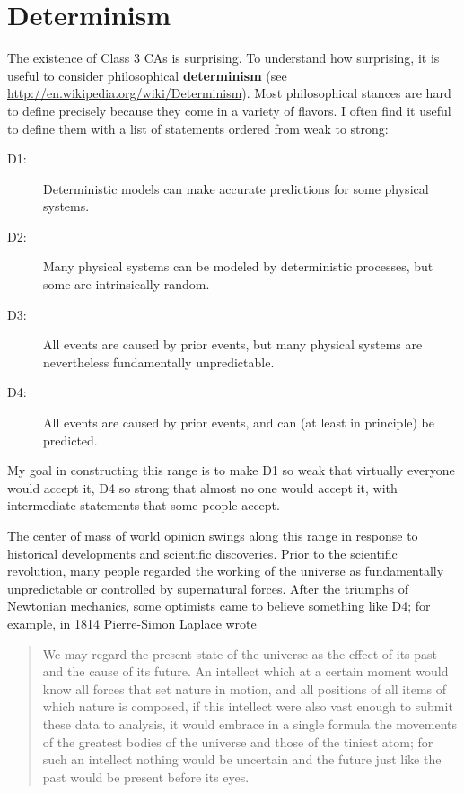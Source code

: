 \documentclass[10pt]{book}
\begin{document}
\section{Determinism}
\label{determinism}

The existence of Class 3 CAs is surprising.  To understand how
surprising, it is useful to consider philosophical
{\bf determinism} (see \url{http://en.wikipedia.org/wiki/Determinism}).
Most philosophical stances are hard to define precisely because
they come in a variety of flavors.  I often find it useful
to define them with a list of statements ordered from weak
to strong:

\begin{description}

\item[D1:] Deterministic models can make accurate predictions
for some physical systems.

\item[D2:] Many physical systems can be modeled by deterministic
processes, but some are intrinsically random.

\item[D3:] All events are caused by prior events, but many
physical systems are nevertheless fundamentally unpredictable.

\item[D4:] All events are caused by prior events, and can (at
least in principle) be predicted.

\end{description}

My goal in constructing this range is to make D1 so weak that
virtually everyone would accept it, D4 so strong that almost no one
would accept it, with intermediate statements that some people accept.

The center of mass of world opinion swings along this range in
response to historical developments and scientific discoveries.  Prior
to the scientific revolution, many people regarded the working of the
universe as fundamentally unpredictable or controlled by supernatural
forces.  After the triumphs of Newtonian mechanics, some optimists
came to believe something like D4; for example, in 1814 Pierre-Simon
Laplace wrote

\begin{quote}
We may regard the present state of the universe as the effect of its
past and the cause of its future. An intellect which at a certain
moment would know all forces that set nature in motion, and all
positions of all items of which nature is composed, if this intellect
were also vast enough to submit these data to analysis, it would
embrace in a single formula the movements of the greatest bodies of
the universe and those of the tiniest atom; for such an intellect
nothing would be uncertain and the future just like the past would be
present before its eyes.
\end{quote}
\end{document}

